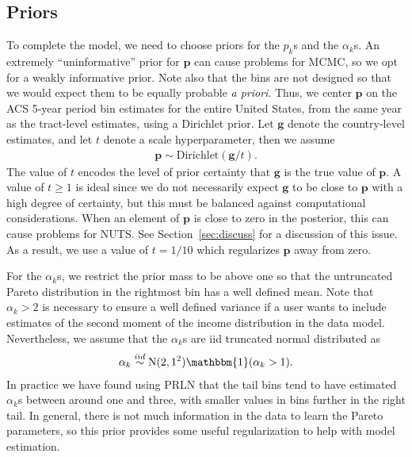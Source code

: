 \documentclass[12pt]{article}
\begin{document}
\subsection{Priors}\label{subsec:priors}
To complete the model, we need to choose priors for the $p_k$s and the $\alpha_k$s. An extremely ``uninformative'' prior for $\bm{p}$ can cause problems for MCMC, so we opt for a weakly informative prior. Note also that the bins are not designed so that we would expect them to be equally probable {\it a priori}. Thus, we center $\bm{p}$ on the ACS 5-year period bin estimates for the entire United States, from the same year as the tract-level estimates, using a Dirichlet prior. Let $\bm{g}$ denote the country-level estimates, and let $t$ denote a scale hyperparameter, then we assume
\begin{align*}
\bm{p} \sim \mathrm{Dirichlet}(\bm{g} / t).
\end{align*}
The value of $t$ encodes the level of prior certainty that $\bm{g}$ is the true value of $\bm{p}$. A value of $t\geq 1$ is ideal since we do not necessarily expect $\bm{g}$ to be close to $\bm{p}$ with a high degree of certainty, but this must be balanced against computational considerations. When an element of $\bm{p}$ is close to zero in the posterior, this can cause problems for NUTS. See Section~\ref{sec:discuss} for a discussion of this issue. As a result, we use a value of $t=1/10$ which regularizes $\bm{p}$ away from zero.

For the $\alpha_k$s, we restrict the prior mass to be above one so that the untruncated Pareto distribution in the rightmost bin has a well defined mean. Note that $\alpha_k > 2$ is necessary to ensure a well defined variance if a user wants to include estimates of the second moment of the income distribution in the data model. Nevertheless, we assume that the $\alpha_k$s are iid truncated normal distributed as
\begin{align*}
  \alpha_k \stackrel{iid}{\sim}\mathrm{N}(2, 1^2)\mathbbm{1}(\alpha_k > 1).
\end{align*}
In practice we have found using PRLN that the tail bins tend to have estimated $\alpha_k$s between around one and three, with smaller values in bins further in the right tail. In general, there is not much information in the data to learn the Pareto parameters, so this prior provides some useful regularization to help with model estimation.
\end{document}
